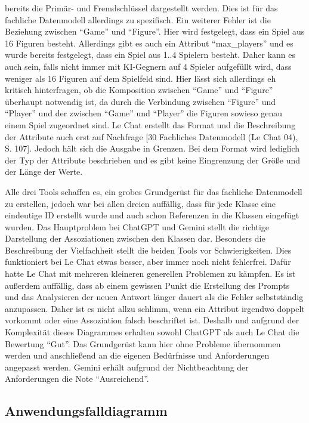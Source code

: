 bereits die Primär- und Fremdschlüssel dargestellt werden. Dies ist für das fachliche Datenmodell allerdings zu spezifisch. Ein weiterer 
Fehler ist die Beziehung zwischen ``Game'' und ``Figure''. Hier wird festgelegt, dass ein Spiel aus 16 Figuren besteht. Allerdings gibt es 
auch ein Attribut ``max\_players'' und es wurde bereits festgelegt, dass ein Spiel aus 1..4 Spielern besteht. Daher kann es auch sein, falls 
nicht immer mit KI-Gegnern auf 4 Spieler aufgefüllt wird, dass weniger als 16 Figuren auf dem Spielfeld sind. Hier lässt sich allerdings 
eh kritisch hinterfragen, ob die Komposition zwischen ``Game'' und ``Figure'' überhaupt notwendig ist, da durch die Verbindung zwischen 
``Figure'' und ``Player'' und der zwischen ``Game'' und ``Player'' die Figuren sowieso genau einem Spiel zugeordnet sind. Le Chat erstellt das 
Format und die Beschreibung der Attribute auch erst auf Nachfrage [30 Fachliches Datenmodell (Le Chat 04), S. 107]. Jedoch hält sich die 
Ausgabe in Grenzen. Bei dem Format wird lediglich der Typ der Attribute beschrieben und es gibt keine Eingrenzung der Größe und der Länge 
der Werte.

Alle drei Tools schaffen es, ein grobes Grundgerüst für das fachliche Datenmodell zu erstellen, jedoch war bei allen dreien auffällig, 
dass für jede Klasse eine eindeutige ID erstellt wurde und auch schon Referenzen in die Klassen eingefügt wurden. Das Hauptproblem bei 
ChatGPT und Gemini stellt die richtige Darstellung der Assoziationen zwischen den Klassen dar. Besonders die Beschreibung der 
Vielfachheit stellt die beiden Tools vor Schwierigkeiten. Dies funktioniert bei Le Chat etwas besser, aber immer noch nicht fehlerfrei. 
Dafür hatte Le Chat mit mehreren kleineren generellen Problemen zu kämpfen. Es ist außerdem auffällig, dass ab einem gewissen Punkt 
die Erstellung des Prompts und das Analysieren der neuen Antwort länger dauert als die Fehler selbstständig anzupassen. Daher ist es 
nicht allzu schlimm, wenn ein Attribut irgendwo doppelt vorkommt oder eine Assoziation falsch beschriftet ist. Deshalb und aufgrund 
der Komplexität dieses Diagrammes erhalten sowohl ChatGPT als auch Le Chat die Bewertung ``Gut''. Das Grundgerüst kann hier ohne Probleme 
übernommen werden und anschließend an die eigenen Bedürfnisse und Anforderungen angepasst werden. Gemini erhält aufgrund der 
Nichtbeachtung der Anforderungen die Note ``Ausreichend''.


\subsection*{Anwendungsfalldiagramm}


